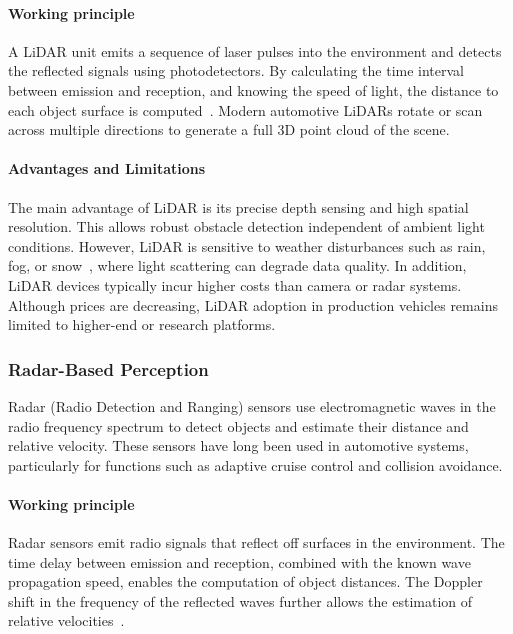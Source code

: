 \paragraph{Working principle}

A LiDAR unit emits a sequence of laser pulses into the environment and detects the reflected signals 
using photodetectors. By calculating the time interval between emission and reception, and knowing 
the speed of light, the distance to each object surface is computed~\cite{lidarbased_review}. Modern 
automotive LiDARs rotate or scan across multiple directions to generate a full 3D point cloud of the 
scene.

\paragraph{Advantages and Limitations}

The main advantage of LiDAR is its precise depth sensing and high spatial resolution. This allows 
robust obstacle detection independent of ambient light conditions. However, LiDAR is sensitive to 
weather disturbances such as rain, fog, or snow~\cite{lidarAdverseWeather}, where light scattering can degrade data quality. 
In addition, LiDAR devices typically incur higher costs than camera or radar systems. Although prices are decreasing, 
LiDAR adoption in production vehicles remains limited to higher-end or research platforms.

\subsubsection{Radar-Based Perception}

Radar (Radio Detection and Ranging) sensors use electromagnetic waves in the radio frequency spectrum 
to detect objects and estimate their distance and relative velocity. These sensors have long been 
used in automotive systems, particularly for functions such as adaptive cruise control and collision 
avoidance.

\paragraph{Working principle}

Radar sensors emit radio signals that reflect off surfaces in the environment. The time delay 
between emission and reception, combined with the known wave propagation speed, enables the 
computation of object distances. The Doppler shift in the frequency of the reflected waves 
further allows the estimation of relative velocities~\cite{radarbased_velocity}. 

